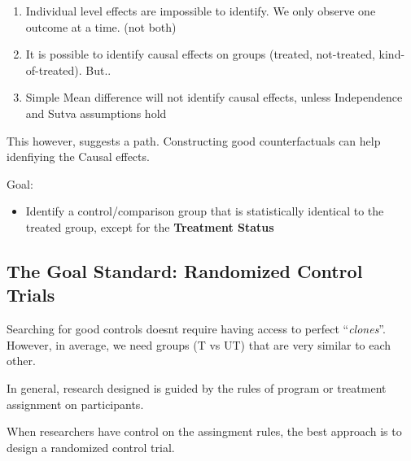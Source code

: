 \documentclass[
  letterpaper,
  DIV=11,
  numbers=noendperiod]{scrartcl}
\providecommand{\tightlist}{%
  \setlength{\itemsep}{0pt}\setlength{\parskip}{0pt}}\usepackage{longtable,booktabs,array}
\begin{document}
\begin{enumerate}
\def\labelenumi{\arabic{enumi}.}
\tightlist
\item
  Individual level effects are impossible to identify. We only observe
  one outcome at a time. (not both)
\item
  It is possible to identify causal effects on groups (treated,
  not-treated, kind-of-treated). But..
\item
  Simple Mean difference will not identify causal effects, unless
  Independence and Sutva assumptions hold
\end{enumerate}

This however, suggests a path. Constructing good counterfactuals can
help idenfiying the Causal effects.

Goal:

\begin{itemize}
\tightlist
\item
  Identify a control/comparison group that is statistically identical to
  the treated group, except for the \textbf{Treatment Status}
\end{itemize}

\hypertarget{the-goal-standard-randomized-control-trials}{%
\subsection{The Goal Standard: Randomized Control
Trials}\label{the-goal-standard-randomized-control-trials}}

\begin{tcolorbox}[enhanced jigsaw, left=2mm, colbacktitle=quarto-callout-important-color!10!white, opacitybacktitle=0.6, leftrule=.75mm, rightrule=.15mm, breakable, coltitle=black, colback=white, opacityback=0, colframe=quarto-callout-important-color-frame, bottomtitle=1mm, toprule=.15mm, arc=.35mm, titlerule=0mm, title=\textcolor{quarto-callout-important-color}{\faExclamation}\hspace{0.5em}{To keep in mind}, toptitle=1mm, bottomrule=.15mm]

Searching for good controls doesnt require having access to perfect
``\emph{clones}''. However, in average, we need groups (T vs UT) that
are very similar to each other.

\end{tcolorbox}

In general, research designed is guided by the rules of program or
treatment assignment on participants.

When researchers have control on the assingment rules, the best approach
is to design a randomized control trial.
\end{document}

